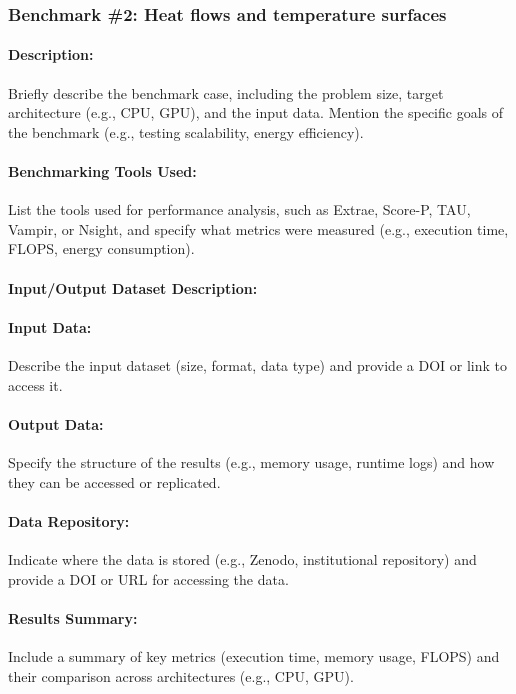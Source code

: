 \subsubsection{Benchmark \#2: Heat flows and temperature surfaces}

\paragraph{Description:} Briefly describe the benchmark case, including the problem size, target architecture (e.g., CPU, GPU), and the input data. Mention the specific goals of the benchmark (e.g., testing scalability, energy efficiency).

\paragraph{Benchmarking Tools Used:} List the tools used for performance analysis, such as Extrae, Score-P, TAU, Vampir, or Nsight, and specify what metrics were measured (e.g., execution time, FLOPS, energy consumption).

\paragraph{Input/Output Dataset Description:}
\paragraph{Input Data:} Describe the input dataset (size, format, data type) and provide a DOI or link to access it.

\paragraph{Output Data:} Specify the structure of the results (e.g., memory usage, runtime logs) and how they can be accessed or replicated.

\paragraph{Data Repository:} Indicate where the data is stored (e.g., Zenodo, institutional repository) and provide a DOI or URL for accessing the data.

\paragraph{Results Summary:} Include a summary of key metrics (execution time, memory usage, FLOPS) and their comparison across architectures (e.g., CPU, GPU).

